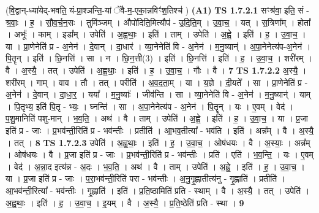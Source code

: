 \documentclass[17pt]{extarticle}
\begin{document}
                      (वि॒द्वान्-ध्या॑येद्-भवति॒ यं-प्रा॒श्ञन्ति॒-यां ॅवै-म॒-एका॒न्नविꣳ॑श॒तिश्च॑ )  \textbf{(A1)} \newline \newline
                                \textbf{ TS 1.7.2.1} \newline
                  सꣳश्र॑वा॒ इति॒ सं - श्र॒वाः॒ । ह॒ । सौ॒व॒र्च॒न॒सः । तुमि॑ञ्जम् । औपो॑दिति॒मित्यौप॑ - उ॒दि॒ति॒म् । उ॒वा॒च॒ । यत् । स॒त्रिणा᳚म् । होता᳚ । अभूः᳚ । काम् । इडा᳚म् । उपेति॑ । अ॒ह्व॒थाः॒ । इति॑ । ताम् । उपेति॑ । अ॒ह्वे॒ । इति॑ । ह॒ । उ॒वा॒च॒ । या । प्रा॒णेनेति॑ प्र - अ॒नेन॑ । दे॒वान् । दा॒धार॑ । व्या॒नेनेति॑ वि - अ॒नेन॑ । म॒नु॒ष्यान्॑ । अ॒पा॒नेनेत्य॑प-अ॒नेन॑ । पि॒तॄन् । इति॑ । छि॒नत्ति॑ । सा । न । छि॒न॒त्ती(3) । इति॑ । छि॒नत्ति॑ । इति॑ । ह॒ । उ॒वा॒च॒ । शरी॑रम् । वै । अ॒स्यै॒ । तत् । उपेति॑ । अ॒ह्व॒थाः॒ । इति॑ । ह॒ । उ॒वा॒च॒ । गौः । वै । \textbf{  7} \newline
                  \newline
                                \textbf{ TS 1.7.2.2} \newline
                  अ॒स्यै॒ । शरी॑रम् । गाम् । वाव । तौ । तत् । परीति॑ । अ॒व॒द॒ता॒म् । या । य॒ज्ञे । दी॒यते᳚ । सा । प्रा॒णेनेति॑ प्र - अ॒नेन॑ । दे॒वान् । दा॒धा॒र॒ । यया᳚ । म॒नु॒ष्याः᳚ । जीव॑न्ति । सा । व्या॒नेनेति॑ वि - अ॒नेन॑ । म॒नु॒ष्यान्॑ । याम् । पि॒तृभ्य॒ इति॑ पि॒तृ - भ्यः॒ । घ्नन्ति॑ । सा । अ॒पा॒नेनेत्य॑प - अ॒नेन॑ । पि॒तॄन् । यः । ए॒वम् । वेद॑ । प॒शु॒मानिति॑ पशु-मान् । भ॒व॒ति॒ । अथ॑ । वै । ताम् । उपेति॑ । अ॒ह्वे॒ । इति॑ । ह॒ । उ॒वा॒च॒ । या । प्र॒जा इति॑ प्र - जाः । प्र॒भव॑न्ती॒रिति॑ प्र - भव॑न्तीः । प्रतीति॑ । आ॒भव॒तीत्या᳚ - भव॑ति । इति॑ । अन्न᳚म् । वै । अ॒स्यै॒ । तत् । \textbf{  8} \newline
                  \newline
                                \textbf{ TS 1.7.2.3} \newline
                  उपेति॑ । अ॒ह्व॒थाः॒ । इति॑ । ह॒ । उ॒वा॒च॒ । ओष॑धयः । वै । अ॒स्याः॒ । अन्न᳚म् । ओष॑धयः । वै । प्र॒जा इति॑ प्र - जाः । प्र॒भव॑न्ती॒रिति॑ प्र - भव॑न्तीः । प्रति॑ । एति॑ । भ॒व॒न्ति॒ । यः । ए॒वम् । वेद॑ । अ॒न्ना॒द इत्य॑न्न - अ॒दः । भ॒व॒ति॒ । अथ॑ । वै । ताम् । उपेति॑ । अ॒ह्वे॒ । इति॑ । ह॒ । उ॒वा॒च॒ । या । प्र॒जा इति॑ प्र - जाः । प॒रा॒भव॑न्ती॒रिति॑ परा - भव॑न्तीः । अ॒नु॒गृ॒ह्णातीत्य॑नु - गृ॒ह्णाति॑ । प्रतीति॑ । आ॒भव॑न्ती॒रित्या᳚ - भव॑न्तीः । गृ॒ह्णाति॑ । इति॑ । प्र॒ति॒ष्ठामिति॑ प्रति - स्थाम् । वै । अ॒स्यै॒ । तत् । उपेति॑ । अ॒ह्व॒थाः॒ । इति॑ । ह॒ । उ॒वा॒च॒ । इ॒यम् । वै । अ॒स्यै॒ । प्र॒ति॒ष्ठेति॑ प्रति - स्था । \textbf{  9} \newline
\end{document}
